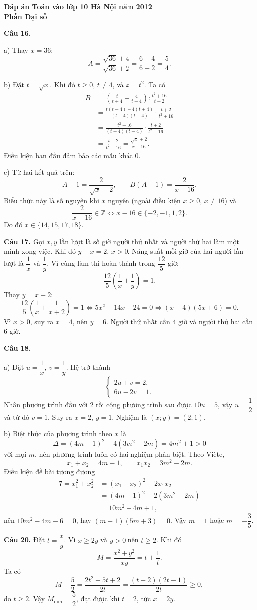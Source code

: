 \documentclass[12pt,a4paper]{article}
\begin{document}
\begin{center}\Large\bfseries Đáp án Toán vào lớp 10 Hà Nội năm 2012\\Phần Đại số\end{center}

\textbf{Câu 16.}

a) Thay $x=36$:
\[
A=\frac{\sqrt{36}+4}{\sqrt{36}+2}=\frac{6+4}{6+2}=\frac54.
\]

b) Đặt $t=\sqrt{x}$. Khi đó $t\ge0$, $t\ne4$, và $x=t^2$. Ta có
\begin{align*}
B&=\left(\frac{t}{t+4}+\frac4{t-4}\right):\frac{t^2+16}{t+2}\\
&=\frac{t(t-4)+4(t+4)}{(t+4)(t-4)}\cdot\frac{t+2}{t^2+16}\\
&=\frac{t^2+16}{(t+4)(t-4)}\cdot\frac{t+2}{t^2+16}\\
&=\frac{t+2}{t^2-16}=\frac{\sqrt{x}+2}{x-16}.
\end{align*}
Điều kiện ban đầu đảm bảo các mẫu khác $0$.

c) Từ hai kết quả trên:
\[
A-1=\frac{2}{\sqrt{x}+2},\qquad B(A-1)=\frac{2}{x-16}.
\]
Biểu thức này là số nguyên khi $x$ nguyên (ngoài điều kiện $x\ge0$, $x\ne16$) và
\[
\frac2{x-16}\in\mathbb Z
\iff x-16\in\{-2,-1,1,2\}.
\]
Do đó $x\in\{14,15,17,18\}$.

\textbf{Câu 17.} Gọi $x,y$ lần lượt là số giờ người thứ nhất và người thứ hai làm một mình xong việc. Khi đó $y-x=2$, $x>0$. Năng suất mỗi giờ của hai người lần lượt là $\dfrac1x$ và $\dfrac1y$. Vì cùng làm thì hoàn thành trong $\dfrac{12}{5}$ giờ:
\[
\frac{12}{5}\left(\frac1x+\frac1y\right)=1.
\]
Thay $y=x+2$:
\[
\frac{12}{5}\left(\frac1x+\frac1{x+2}\right)=1
\iff 5x^2-14x-24=0
\iff (x-4)(5x+6)=0.
\]
Vì $x>0$, suy ra $x=4$, nên $y=6$. Người thứ nhất cần $4$ giờ và người thứ hai cần $6$ giờ.

\textbf{Câu 18.}

a) Đặt $u=\dfrac1x$, $v=\dfrac1y$. Hệ trở thành
\[
\begin{cases}2u+v=2,\\6u-2v=1.\end{cases}
\]
Nhân phương trình đầu với $2$ rồi cộng phương trình sau được $10u=5$, vậy $u=\dfrac12$ và từ đó $v=1$. Suy ra $x=2$, $y=1$. Nghiệm là $(x;y)=(2;1)$.

b) Biệt thức của phương trình theo $x$ là
\[
\Delta=(4m-1)^2-4(3m^2-2m)=4m^2+1>0
\]
với mọi $m$, nên phương trình luôn có hai nghiệm phân biệt. Theo Viète,
\[
x_1+x_2=4m-1,\qquad x_1x_2=3m^2-2m.
\]
Điều kiện đề bài tương đương
\begin{align*}
7=x_1^2+x_2^2&=(x_1+x_2)^2-2x_1x_2\\
&=(4m-1)^2-2(3m^2-2m)\\
&=10m^2-4m+1,
\end{align*}
nên $10m^2-4m-6=0$, hay $(m-1)(5m+3)=0$. Vậy $m=1$ hoặc $m=-\dfrac35$.

\textbf{Câu 20.} Đặt $t=\dfrac{x}{y}$. Vì $x\ge2y$ và $y>0$ nên $t\ge2$. Khi đó
\[
M=\frac{x^2+y^2}{xy}=t+\frac1t.
\]
Ta có
\[
M-\frac52=\frac{2t^2-5t+2}{2t}
=\frac{(t-2)(2t-1)}{2t}\ge0,
\]
do $t\ge2$. Vậy $M_{\min}=\dfrac52$, đạt được khi $t=2$, tức $x=2y$.
\end{document}
